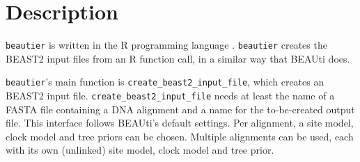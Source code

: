 \documentclass{article}
\begin{document}
\section{Description}

\verb;beautier; is written in the R programming language \cite{R}.
\verb;beautier; creates the BEAST2 input files from an R function call,
in a similar way that BEAUti does.

\verb;beautier;'s main function is \verb;create_beast2_input_file;, which creates
an BEAST2 input file. \verb;create_beast2_input_file; needs at least the name of a FASTA file containing a DNA alignment
and a name for the to-be-created output file. This interface follows BEAUti's default settings.
Per alignment, a site model, clock model and tree priors can be chosen.
Multiple alignments can be used, each with its own (unlinked) site model, clock model and tree prior.
\end{document}

